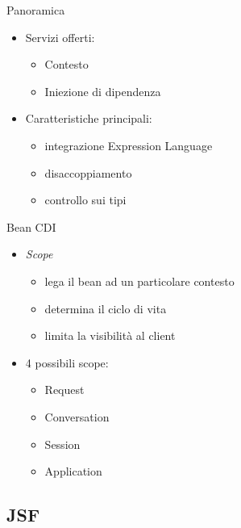 \begin{frame}{Panoramica}

\begin{itemize}
\item Servizi offerti:
	\begin{itemize}
	\item Contesto
	\item Iniezione di dipendenza
	\end{itemize}

\item Caratteristiche principali:
	\begin{itemize}
	\item integrazione Expression Language
	\item disaccoppiamento
	\item controllo sui tipi
	\end{itemize}
\end{itemize}

\end{frame}

\begin{frame}{Bean CDI}

\begin{itemize}
\item \textsl{Scope}
	\begin{itemize}
	\item lega il bean ad un particolare contesto
	\item determina il ciclo di vita
	\item limita la visibilità al client
	\end{itemize}
	
\item 4 possibili scope:
	\begin{itemize}
	\item Request
	\item Conversation
	\item Session
	\item Application
	\end{itemize}

\end{itemize}

\end{frame}



\subsection{JSF}

